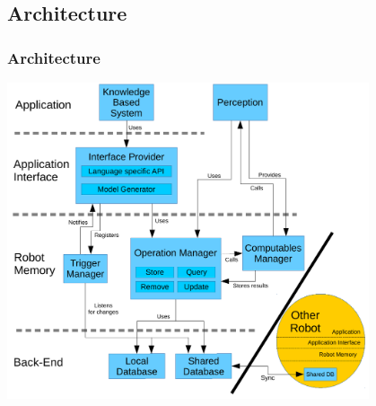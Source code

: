 \subsection{Architecture}
\begin{frame}
  \frametitle{Architecture}
  \center
  \includegraphics[width=0.8\textwidth]{../thesis/architecture.pdf}
\end{frame}

